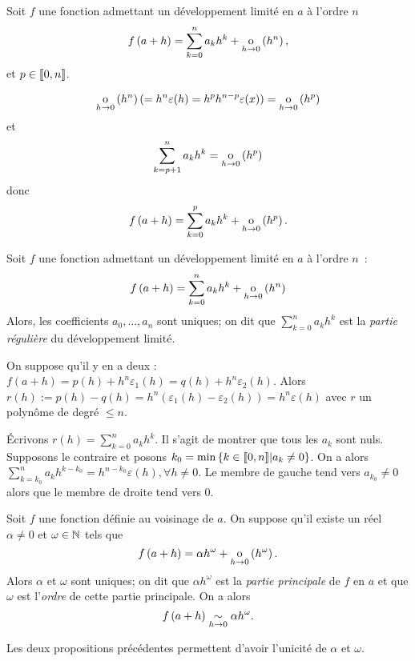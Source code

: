\documentclass{magnoliaold}
\begin{document}
\begin{preuve}
Soit $f$ une fonction admettant un développement limité en $a$ à
l'ordre $n$
\[f\left(a+h\right)=\sum_{k=0}^n a_k h^k+\underset{h \rightarrow 0}{\text{o}}\left(h^n\right),\]
et $p\in\left\llbracket 0,n\right\rrbracket$.

\[\underset{h \rightarrow 0}{\text{o}}\left(h^n\right)(=h^n\varepsilon(h)=h^ph^{n-p}\varepsilon(x))=\underset{h \rightarrow 0}{\text{o}}\left(h^p\right)\]
et 
\[\sum_{k=p+1}^n a_k h^k=\underset{h \rightarrow 0}{\text{o}}\left(h^p\right)\]
donc 
\[f\left(a+h\right)=\sum_{k=0}^p a_k h^k+\underset{h \rightarrow 0}{\text{o}}\left(h^p\right).\]
\end{preuve}

\begin{proposition}[utile=-3]
Soit $f$ une fonction admettant un développement limité en $a$ à
l'ordre $n$~:
\[f\left(a+h\right)=\sum_{k=0}^n a_k h^k+\underset{h \rightarrow 0}{\text{o}}\left(h^n\right)\]
Alors, les coefficients $a_0,\ldots,a_n$ sont uniques; on dit que
$\sum_{k=0}^n a_k h^k$ est la \emph{partie régulière} du développement limité.
\end{proposition}

\begin{preuve}
On suppose qu'il y en a deux : $f(a+h)=p(h)+h^n\varepsilon_1(h)=q(h)+h^n\varepsilon_2(h)$. Alors $r(h):=p(h)-q(h)=h^n(\varepsilon_1(h)-\varepsilon_2(h))=h^n\varepsilon(h)$ avec $r$ un polynôme de degré $\leq n$.

\'Ecrivons $r(h)=\displaystyle\sum_{k=0}^na_kh^k$. Il s'agit de montrer que tous les $a_k$ sont nuls. Supposons le contraire et posons $k_0=\min\left\{k\in\llbracket0,n\rrbracket | a_k\neq0\right\}$. On a alors $\displaystyle \sum_{k=k_0}^na_k h^{k-k_0}=h^{n-k_0}\varepsilon(h), \forall h\neq 0$. Le membre de gauche tend vers $a_{k_0}\neq 0$ alors que le membre de droite tend vers $0$.
\end{preuve}

\begin{definition}[utile=-3]
Soit $f$ une fonction définie au voisinage de $a$. On suppose qu'il existe
un réel $\alpha\neq 0$ et $\omega\in\mathbb{N}$ tels que
\[f\left(a+h\right)=\alpha h^\omega+\underset{h \rightarrow 0}{\text{o}}\left(h^\omega\right).\]
Alors $\alpha$ et $\omega$ sont uniques; on dit que $\alpha h^\omega$ est
la \emph{partie principale} de $f$ en $a$ et que $\omega$ est l'\emph{ordre} de
cette partie principale. On a alors
\[f\left(a+h\right)\underset{h\rightarrow 0}{\sim} \alpha h^\omega.\]
\end{definition}

\begin{preuve}
Les deux propositions précédentes permettent d'avoir l'unicité de $\alpha$ et $\omega$.
\end{preuve}


\end{document}
